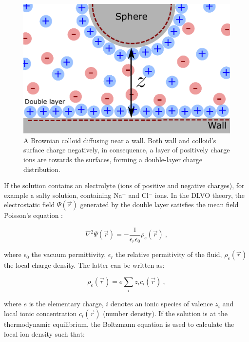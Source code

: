 \begin{figure}[h]
	\centering
	\includegraphics{02_body/chapter3/images/double_layer.pdf}
	\caption{A Brownian colloid diffusing near a wall. Both wall and colloid's surface charge negatively, in consequence, a layer of positively charge ions are towards the surfaces, forming a double-layer charge distribution.}
	\label{Fig:double_layer}
\end{figure}




If the solution contains an electrolyte (ions of positive and negative charges), for example a salty solution, containing Na$^+$ and Cl$^-$ ions. In the DLVO theory, the electrostatic field $\Psi(\vec{r})$ generated by the double layer satisfies the mean field Poisson's equation \cite{israelachvili_intermolecular_2015}:

\begin{equation}
	\nabla ^2 \Psi(\vec{r}) = -\frac{1}{\epsilon_r \epsilon_0}  \rho_e(\vec{r})~,
	\label{Eq:poisson}
\end{equation}

where $\epsilon_0$ the vacuum permittivity, $\epsilon_r$ the relative permitivity of the fluid, $\rho_e(\vec{r})$ the local charge density. The latter can be written as:

\begin{equation}
	\rho_e(\vec{r}) = e \sum _i z_i c_i (\vec{r}) ~,
	\label{Eq.3}
\end{equation}

where $e$ is the elementary charge, $i$ denotes an ionic species of valence $z_i$ and local ionic concentration $c_i(\vec{r})$ (number density). If the solution is at the thermodynamic equilibrium, the Boltzmann equation is used to calculate the local ion density such that:

